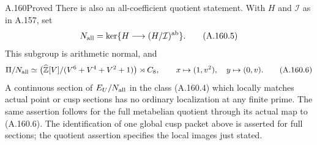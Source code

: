 \begin{statement}{A.160}{Proved}
There is also an all-coefficient quotient statement.  With
\(H\) and \(\mathcal I\) as in A.157, set
\[
 N_{\rm all}=\ker\{H\longrightarrow(H/\mathcal I)^{\rm ab}\}.
\tag{A.160.5}
\]
This subgroup is arithmetic normal, and
\[
 \Pi/N_{\rm all}\simeq
 \bigl(\widehat{\mathbb Z}[V]/(V^6+V^4+V^2+1)\bigr)\rtimes C_8,
       \qquad x\mapsto(1,v^2),\quad y\mapsto(0,v).
\tag{A.160.6}
\]
A continuous section of \(E_U/N_{\rm all}\) in the class
(A.160.4) which locally matches actual point or cusp
sections has no ordinary localization at any finite prime.
The same assertion follows for the full metabelian quotient
through its actual map to (A.160.6).  The identification of
one global cusp packet above is asserted for full sections;
the quotient assertion specifies the local images just stated.
\end{statement}


